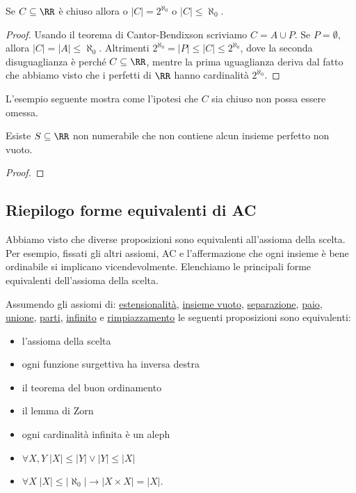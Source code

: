 \documentclass[11pt]{scrartcl}
\begin{document}
\begin{corollary}
	Se $C \subseteq \RR$ è chiuso allora o $|C|=2^{\aleph_0}$ o $|C| \leq \aleph_0$.
\end{corollary}

\begin{proof}
	Usando il teorema di Cantor-Bendixson scriviamo $C = A \cup P$. Se $P = \emptyset$, allora $|C| = |A| \leq \aleph_0$.
	Altrimenti $2^{\aleph_0} = |P| \leq |C| \leq 2^{\aleph_0}$, dove la seconda disuguaglianza è perché $C \subseteq \RR$, mentre la prima uguaglianza 
	deriva dal fatto che abbiamo visto che i perfetti di $\RR$ hanno cardinalità $2^{\aleph_0}$.
\end{proof}

L'esempio seguente mostra come l'ipotesi che $C$ sia chiuso non possa essere omessa.

\begin{example}
	Esiste $S \subseteq \RR$ non numerabile che non contiene alcun insieme perfetto non vuoto.
\end{example}

\begin{proof}
	
\end{proof}

\subsection{\texorpdfstring{\;Riepilogo forme equivalenti di AC}{Riepilogo forme equivalenti di AC}}
Abbiamo visto che diverse proposizioni sono equivalenti all'assioma della scelta. Per esempio, fissati gli altri assiomi, AC e 
l'affermazione che ogni insieme è bene ordinabile si implicano vicendevolmente. Elenchiamo le principali forme equivalenti dell'assioma della scelta.

\begin{proposition}
	Assumendo gli assiomi di: \hyperref[ax2]{estensionalità}, \hyperref[ax1]{insieme vuoto}, \hyperref[ax3]{separazione}, \hyperref[ax4]{paio}, \hyperref[ax5]{unione},
	\hyperref[ax6]{parti}, \hyperref[ax7]{infinito} e \hyperref[ax8]{rimpiazzamento} le seguenti proposizioni sono equivalenti:
	\begin{itemize}
		\item l'assioma della scelta
		\item ogni funzione surgettiva ha inversa destra
		\item il teorema del buon ordinamento
		\item il lemma di Zorn
		\item ogni cardinalità infinita è un aleph
		\item $\forall X,Y \; |X| \leq |Y| \lor |Y| \leq |X|$
		\item $\forall X \; |X| \leq |\aleph_0| \rightarrow |X \times X| = |X|$.
	\end{itemize}
\end{proposition}
\end{document}
